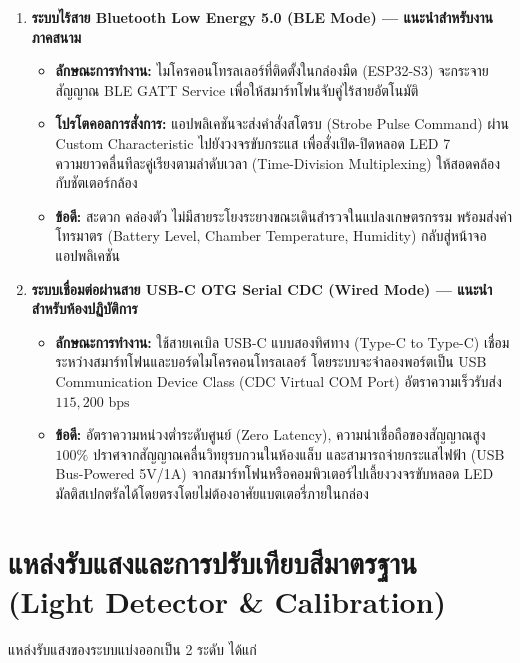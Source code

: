 \documentclass[12pt,a4paper,oneside]{book}
\begin{document}
\begin{enumerate}
    \item \textbf{ระบบไร้สาย Bluetooth Low Energy 5.0 (BLE Mode) --- แนะนำสำหรับงานภาคสนาม}
    \begin{itemize}
        \item \textbf{ลักษณะการทำงาน:} ไมโครคอนโทรลเลอร์ที่ติดตั้งในกล่องมืด (ESP32-S3) จะกระจายสัญญาณ BLE GATT Service เพื่อให้สมาร์ทโฟนจับคู่ไร้สายอัตโนมัติ
        \item \textbf{โปรโตคอลการสั่งการ:} แอปพลิเคชันจะส่งคำสั่งสโตรบ (Strobe Pulse Command) ผ่าน Custom Characteristic ไปยังวงจรขับกระแส เพื่อสั่งเปิด-ปิดหลอด LED 7 ความยาวคลื่นทีละคู่เรียงตามลำดับเวลา (Time-Division Multiplexing) ให้สอดคล้องกับชัตเตอร์กล้อง
        \item \textbf{ข้อดี:} สะดวก คล่องตัว ไม่มีสายระโยงระยางขณะเดินสำรวจในแปลงเกษตรกรรม พร้อมส่งค่าโทรมาตร (Battery Level, Chamber Temperature, Humidity) กลับสู่หน้าจอแอปพลิเคชัน
    \end{itemize}

    \item \textbf{ระบบเชื่อมต่อผ่านสาย USB-C OTG Serial CDC (Wired Mode) --- แนะนำสำหรับห้องปฏิบัติการ}
    \begin{itemize}
        \item \textbf{ลักษณะการทำงาน:} ใช้สายเคเบิล USB-C แบบสองทิศทาง (Type-C to Type-C) เชื่อมระหว่างสมาร์ทโฟนและบอร์ดไมโครคอนโทรลเลอร์ โดยระบบจะจำลองพอร์ตเป็น USB Communication Device Class (CDC Virtual COM Port) อัตราความเร็วรับส่ง $115,200\text{ bps}$
        \item \textbf{ข้อดี:} อัตราความหน่วงต่ำระดับศูนย์ (Zero Latency), ความน่าเชื่อถือของสัญญาณสูง $100\%$ ปราศจากสัญญาณคลื่นวิทยุรบกวนในห้องแล็บ และสามารถจ่ายกระแสไฟฟ้า (USB Bus-Powered 5V/1A) จากสมาร์ทโฟนหรือคอมพิวเตอร์ไปเลี้ยงวงจรขับหลอด LED มัลติสเปกตรัลได้โดยตรงโดยไม่ต้องอาศัยแบตเตอรี่ภายในกล่อง
    \end{itemize}
\end{enumerate}

\section{แหล่งรับแสงและการปรับเทียบสีมาตรฐาน (Light Detector \& Calibration)}
แหล่งรับแสงของระบบแบ่งออกเป็น 2 ระดับ ได้แก่
\end{document}
